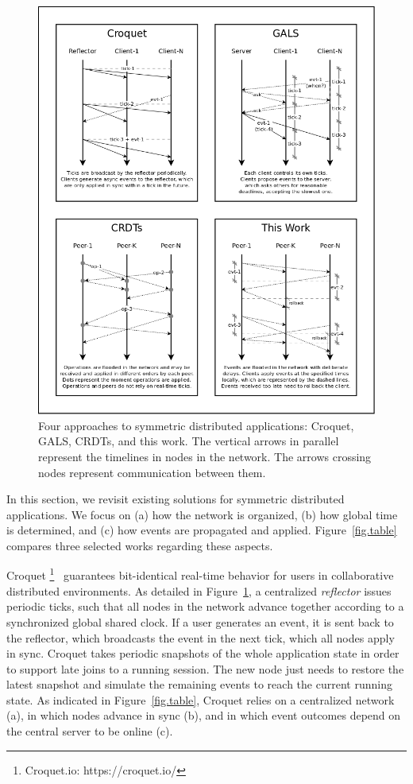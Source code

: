 \documentclass[fleqn,10pt]{SelfArx}
\begin{document}
\begin{figure}
  \centering
  \includegraphics[width=\linewidth]{algos}
  \caption{
    \label{fig.algos}
    Four approaches to symmetric distributed applications: Croquet, GALS,
    CRDTs, and this work.
    The vertical arrows in parallel represent the timelines in nodes in the
    network.
    The arrows crossing nodes represent communication between them.
  }
\end{figure}

In this section, we revisit existing solutions for symmetric distributed
applications.
We focus on
    (a) how the network is organized,
    (b) how global time is determined, and
    (c) how events are propagated and applied.
Figure~\ref{fig.table} compares three selected works regarding these aspects.

Croquet%
\footnote{Croquet.io: https://croquet.io/}~\cite{croquet} guarantees
bit-identical real-time behavior for users in collaborative distributed
environments.
%
As detailed in Figure~\ref{fig.algos}, a centralized \emph{reflector} issues
periodic ticks, such that all nodes in the network advance together according
to a synchronized global shared clock.
If a user generates an event, it is sent back to the reflector, which
broadcasts the event in the next tick, which all nodes apply in sync.
%
Croquet takes periodic snapshots of the whole application state in order to
support late joins to a running session.
The new node just needs to restore the latest snapshot and simulate the
remaining events to reach the current running state.
%
As indicated in Figure~\ref{fig.table}, Croquet relies on a centralized
network (a), in which nodes advance in sync (b), and in which event outcomes
depend on the central server to be online (c).
\end{document}
